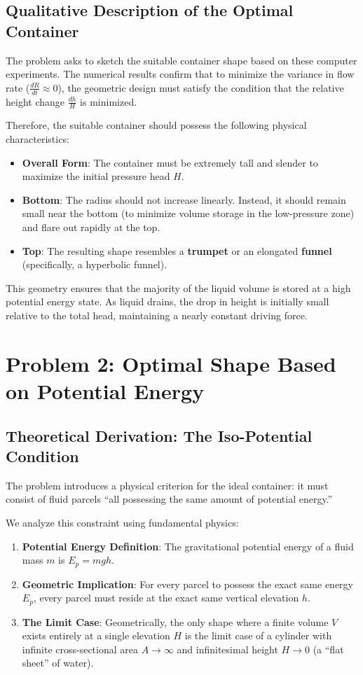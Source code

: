 \documentclass[a4paper, 12pt]{article}
\begin{document}
\subsection{Qualitative Description of the Optimal Container}
The problem asks to sketch the suitable container shape based on these computer experiments. The numerical results confirm that to minimize the variance in flow rate ($\frac{dR}{dt} \approx 0$), the geometric design must satisfy the condition that the relative height change $\frac{dh}{H}$ is minimized.

Therefore, the suitable container should possess the following physical characteristics:
\begin{itemize}
    \item \textbf{Overall Form}: The container must be extremely tall and slender to maximize the initial pressure head $H$.
    \item \textbf{Bottom}: The radius should not increase linearly. Instead, it should remain small near the bottom (to minimize volume storage in the low-pressure zone) and flare out rapidly at the top.
    \item \textbf{Top}: The resulting shape resembles a \textbf{trumpet} or an elongated \textbf{funnel} (specifically, a hyperbolic funnel).
\end{itemize}

This geometry ensures that the majority of the liquid volume is stored at a high potential energy state. As liquid drains, the drop in height is initially small relative to the total head, maintaining a nearly constant driving force.

\section{Problem 2: Optimal Shape Based on Potential Energy}

\subsection{Theoretical Derivation: The Iso-Potential Condition}
The problem introduces a physical criterion for the ideal container: it must consist of fluid parcels ``all possessing the same amount of potential energy.'' 

We analyze this constraint using fundamental physics:
\begin{enumerate}
    \item \textbf{Potential Energy Definition}: The gravitational potential energy of a fluid mass $m$ is $E_p = mgh$.
    \item \textbf{Geometric Implication}: For every parcel to possess the exact same energy $E_p$, every parcel must reside at the exact same vertical elevation $h$.
    \item \textbf{The Limit Case}: Geometrically, the only shape where a finite volume $V$ exists entirely at a single elevation $H$ is the limit case of a cylinder with infinite cross-sectional area $A \to \infty$ and infinitesimal height $H \to 0$ (a ``flat sheet'' of water).
\end{enumerate}
\end{document}
